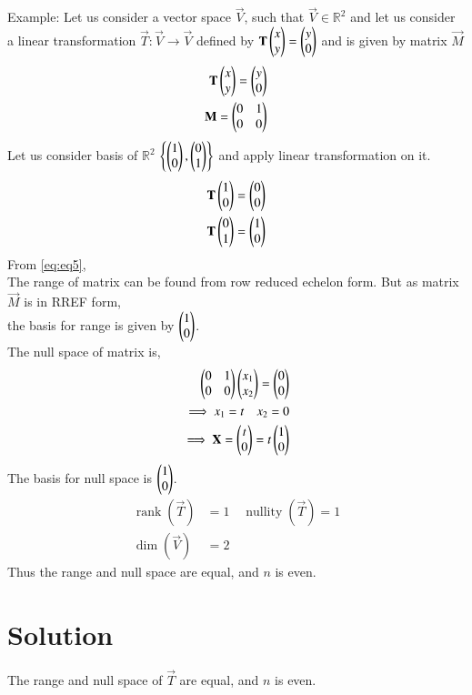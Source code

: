 \documentclass[journal,12pt,twocolumn]{IEEEtran}
\DeclareMathOperator{\rank}{rank}
\DeclareMathOperator{\nullity}{nullity}
\begin{document}
Example: Let us consider a vector space $\vec{V}$, such that $\vec{V} \in \mathbb{R}^2$ and let us consider a linear transformation $\vec{T} : \vec{V} \xrightarrow{}  \vec{V}$ defined by $\mathbf{T}\begin{pmatrix}x\\y\end{pmatrix} = \begin{pmatrix}y\\0\end{pmatrix}$ and is given by matrix $\vec{M}$\\
\begin{align}
    \mathbf{T}\begin{pmatrix}x\\y\end{pmatrix} = \begin{pmatrix}y\\0\end{pmatrix}\\
    \mathbf{M} = \begin{pmatrix}0&1\\0&0\end{pmatrix} \label{eq:eq5}
\end{align}
Let us consider basis of $\mathbb{R}^2$ $\left\{\begin{pmatrix}1\\0\end{pmatrix}, \begin{pmatrix}0\\1\end{pmatrix}\right\}$ and apply linear transformation on it.
\begin{align}
    \mathbf{T}\begin{pmatrix}1\\0\end{pmatrix} = \begin{pmatrix}0\\0\end{pmatrix}\\
    \mathbf{T}\begin{pmatrix}0\\1\end{pmatrix} = \begin{pmatrix}1\\0\end{pmatrix}
\end{align}
From \eqref{eq:eq5},\\
The range of matrix can be found from row reduced echelon form. But as matrix $\vec{M}$ is in RREF form,\\
the basis for range is given by $\begin{pmatrix}1\\0\end{pmatrix}$.\\
The null space of matrix is,
\begin{align}
    \begin{pmatrix}0&1\\0&0\end{pmatrix}\begin{pmatrix}x_1\\x_2\end{pmatrix} = \begin{pmatrix}0\\0\end{pmatrix}\\
\implies x_1 = t \quad x_2 = 0\\
\implies \mathbf{X} = \begin{pmatrix}t\\0\end{pmatrix} = t\begin{pmatrix}1\\0\end{pmatrix}
\end{align}
The basis for null space is $\begin{pmatrix}1\\0\end{pmatrix}$.
\begin{align}
    \rank(\vec{T}) &= 1 \quad \nullity(\vec{T}) = 1 \label{eq:eq6}\\
    \dim(\vec{V}) &= 2 \label{eq:eq7}
\end{align}
Thus the range and null space are equal, and $n$ is even. 
\section{Solution}
The range and null space of $\vec{T}$ are equal, and $n$ is even.
\\
\end{document}
